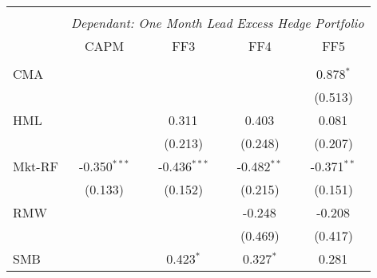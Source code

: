 \begin{table}[H] \centering
  \begin{tabular}{@{\extracolsep{5pt}}lcccc}
    \\[-1.8ex]\hline
    \hline                                                                                                                                                       \\[-1.8ex]
                      & \multicolumn{4}{c}{\textit{Dependant: One Month Lead Excess Hedge Portfolio}} \
    \cr \cline{4-5}
    \\[-1.8ex] & CAPM & FF3 & FF4 & FF5 \\
    \hline                                                                                                                                                       \\[-1.8ex]
    CMA               &                                                                                  &                   &                   & 0.878$^{*}$   \\
                      &                                                                                  &                   &                   & (0.513)       \\
    HML               &                                                                                  & 0.311$^{}$        & 0.403$^{}$        & 0.081$^{}$    \\
                      &                                                                                  & (0.213)           & (0.248)           & (0.207)       \\
    Mkt-RF            & -0.350$^{***}$                                                                   & -0.436$^{***}$    & -0.482$^{**}$     & -0.371$^{**}$ \\
                      & (0.133)                                                                          & (0.152)           & (0.215)           & (0.151)       \\
    RMW               &                                                                                  &                   & -0.248$^{}$       & -0.208$^{}$   \\
                      &                                                                                  &                   & (0.469)           & (0.417)       \\
    SMB               &                                                                                  & 0.423$^{*}$       & 0.327$^{*}$       & 0.281$^{}$    \\

\end{tabular}
\end{table}
